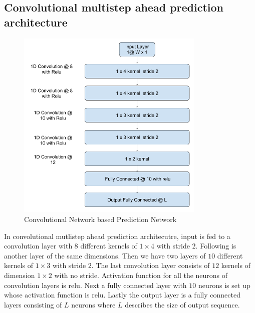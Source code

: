 \documentclass[12pt]{article}
\begin{document}
\subsection{Convolutional multistep ahead prediction architecture}
\begin{figure}[H]
\centering
        \includegraphics[width=0.8\textwidth]{images/architecture/CnnMultistepPrediction.png}
    \caption{Convolutional Network based Prediction Network}
    \label{generalAnomalyDetectionFrameWork}
\end{figure}

In convolutional mutlistep ahead prediction architecutre, input is fed to a convolution layer with $8$ different kernels of $1 \times 4$ with stride $2$. Following is another layer of the same dimensions. Then we have two layers of $10$ different kernels of $1 \times 3$ with stride $2$. The last convolution layer consists of $12$ kernels of dimension $1 \times 2$ with no stride. Activation function for all the neurons of convolution layers is relu. Next a fully connected layer with $10$ neurons is set up whose activation function is relu. Lastly the output layer is a fully connected layers consisting of $L$ neurons where $L$ describes the size of output sequence.
\end{document}
